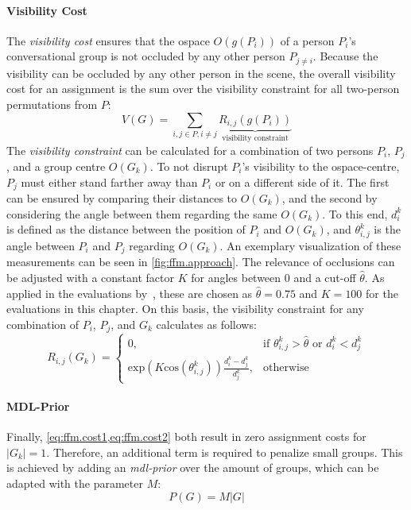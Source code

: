 \paragraph{Visibility Cost}
The \emph{visibility cost} ensures that the \gls{ospace} \(O(g(P_i))\) of a person \(P_i\)'s \gls{conversational group} is not occluded by any other person \(P_{j \neq i}\).
Because the visibility can be occluded by any other person in the scene, the overall visibility cost for an assignment is the sum over the visibility constraint for all two-person permutations from \(P\):
\begin{equation}\label{eq:ffm.cost2}
    V(G) = \sum_{i,j \in P, i \neq j}{\underbrace{R_{i,j}(g(P_i))}_{\text{visibility constraint}}}
\end{equation}
The \emph{visibility constraint} can be calculated for a combination of two persons \(P_i\), \(P_j\), and a group centre \(O(G_k)\).
To not disrupt \(P_i\)'s visibility to the \gls{ospace}-centre, \(P_j\) must either stand farther away than \(P_i\) or on a different side of it.
The first can be ensured by comparing their distances to \(O(G_k)\), and the second by considering the angle between them regarding the same \(O(G_k)\).
To this end, \(d^k_i\) is defined as the distance between the position of \(P_i\) and \(O(G_k)\), and \(\theta^k_{i,j}\) is the angle between \(P_i\) and \(P_j\) regarding \(O(G_k)\).
An exemplary visualization of these measurements can be seen in \cref{fig:ffm.approach}.
The relevance of occlusions can be adjusted with a constant factor \(K\) for angles between \(0\) and a cut-off \(\hat{\theta}\).
As applied in the evaluations by~, these are chosen as \(\hat{\theta} = 0.75\) and \(K = 100\) for the evaluations in this chapter.
On this basis, the visibility constraint for any combination of \(P_i\), \(P_j\), and \(G_k\) calculates as follows:
\[
    R_{i,j}(G_k) = 
    \begin{cases}
        0,& \text{if }\theta^k_{i,j} > \hat{\theta}\text{ or }d^k_i < d^k_j \\
        \text{exp}(K\text{cos}(\theta^k_{i,j}))\frac{d^k_i-d^k_j}{d^k_j},& \text{otherwise}
    \end{cases}
\]

\paragraph{MDL-Prior}

Finally, \cref{eq:ffm.cost1,eq:ffm.cost2} both result in zero assignment costs for \(|G_k|=1\).
Therefore, an additional term is required to penalize small groups.
This is achieved by adding an \emph{\gls{mdl}-prior} over the amount of groups, which can be adapted with the parameter \(M\):
\begin{equation}\label{eq:ffm.cost3}
     P(G) = M|G|
\end{equation}


